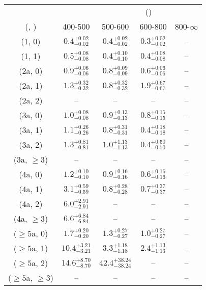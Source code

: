 \begin{table}[h!]
\tiny
\centering
{}
\begin{tabular}
{ccccc}
	\hline\hline
&	& \multicolumn{4}{c}{\scalht (\gev)} \\ 
	 (\njet,  \nb) & 400-500 & 500-600 & 600-800 & 800-$\infty$ \\ [0.8ex] 
\hline
	(1, 0) & $0.4^{+ 0.02 }_{- 0.02 }$ & $0.4^{+ 0.02 }_{- 0.02 }$ & $0.3^{+ 0.02 }_{- 0.02 }$ & -- \\[0.5ex] 
	(1, 1) & $0.5^{+ 0.08 }_{- 0.08 }$ & $0.4^{+ 0.10 }_{- 0.10 }$ & $0.4^{+ 0.08 }_{- 0.08 }$ & -- \\[0.5ex] 
	(2a, 0) & $0.9^{+ 0.06 }_{- 0.06 }$ & $0.8^{+ 0.09 }_{- 0.09 }$ & $0.6^{+ 0.06 }_{- 0.06 }$ & -- \\[0.5ex] 
	(2a, 1) & $1.3^{+ 0.32 }_{- 0.32 }$ & $0.8^{+ 0.32 }_{- 0.32 }$ & $1.9^{+ 0.67 }_{- 0.67 }$ & -- \\[0.5ex] 
	(2a, 2) & -- & -- & -- & -- \\[0.5ex] 
	(3a, 0) & $1.0^{+ 0.08 }_{- 0.08 }$ & $0.9^{+ 0.13 }_{- 0.13 }$ & $0.8^{+ 0.15 }_{- 0.15 }$ & -- \\[0.5ex] 
	(3a, 1) & $1.1^{+ 0.26 }_{- 0.26 }$ & $0.8^{+ 0.31 }_{- 0.31 }$ & $0.4^{+ 0.18 }_{- 0.18 }$ & -- \\[0.5ex] 
	(3a, 2) & $1.3^{+ 0.81 }_{- 0.81 }$ & $1.0^{+ 1.13 }_{- 1.13 }$ & $0.4^{+ 0.50 }_{- 0.50 }$ & -- \\[0.5ex] 
	(3a, $\ge3$) & -- & -- & -- & -- \\[0.5ex] 
	(4a, 0) & $1.2^{+ 0.10 }_{- 0.10 }$ & $0.9^{+ 0.16 }_{- 0.16 }$ & $0.6^{+ 0.16 }_{- 0.16 }$ & -- \\[0.5ex] 
	(4a, 1) & $3.1^{+ 0.59 }_{- 0.59 }$ & $0.8^{+ 0.28 }_{- 0.28 }$ & $0.7^{+ 0.37 }_{- 0.37 }$ & -- \\[0.5ex] 
	(4a, 2) & $6.0^{+ 2.91 }_{- 2.91 }$ & -- & -- & -- \\[0.5ex] 
	(4a, $\ge3$) & $6.6^{+ 6.84 }_{- 6.84 }$ & -- & -- & -- \\[0.5ex] 
	($\ge5$a, 0) & $1.7^{+ 0.20 }_{- 0.20 }$ & $1.3^{+ 0.27 }_{- 0.27 }$ & $1.0^{+ 0.27 }_{- 0.27 }$ & -- \\[0.5ex] 
	($\ge5$a, 1) & $10.4^{+ 3.21 }_{- 3.21 }$ & $3.3^{+ 1.18 }_{- 1.18 }$ & $2.4^{+ 1.13 }_{- 1.13 }$ & -- \\[0.5ex] 
	($\ge5$a, 2) & $14.6^{+ 8.70 }_{- 8.70 }$ & $42.4^{+ 38.24 }_{- 38.24 }$ & -- & -- \\[0.5ex] 
	($\ge5$a, $\ge3$) & -- & -- & -- & -- \\[0.5ex] 
	\hline
	\hline
\end{tabular}
\end{table}
